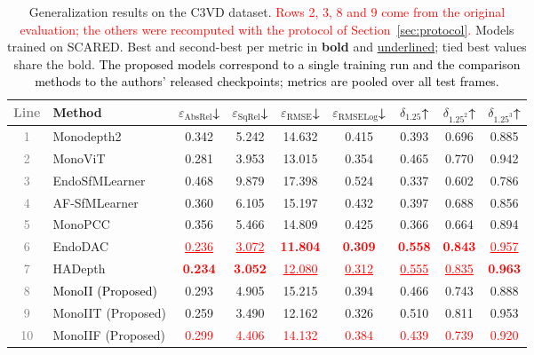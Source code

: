 \documentclass[a4paper,fleqn]{cas-dc}
\begin{document}
{\begin{table}[h]
\centering
\begin{tabular}{clccccccc}
\toprule
\textcolor{gray}{Line} & Method & $\varepsilon_\text{AbsRel}$↓ & 
        $\varepsilon_\text{SqRel}$↓ & 
        $\varepsilon_\text{RMSE}$↓ & 
        $\varepsilon_\text{RMSELog}$↓ & 
        $\delta_{1.25}$↑ & $\delta_{1.25^2}$↑ & 
        $\delta_{1.25^3}$↑ \\
\midrule
\textcolor{gray}{1} &Monodepth2     & 0.342 & 5.242 & 14.632 & 0.415 & 0.393 & 0.696 & 0.885 \\
\textcolor{gray}{2} &MonoViT        & 0.281 & 3.953 & 13.015 & 0.354 & 0.465 & 0.770 & 0.942 \\
\textcolor{gray}{3} &EndoSfMLearner & 0.468 & 9.879 & 17.398 & 0.524 & 0.337 & 0.602 & 0.786 \\
\textcolor{gray}{4} &AF-SfMLearner  & 0.360 & 6.105 & 15.197 & 0.432 & 0.397 & 0.688 & 0.856 \\
\textcolor{gray}{5} &MonoPCC        & 0.356 & 5.466 & 14.809 & 0.425 & 0.366 & 0.664 & 0.894 \\
\textcolor{gray}{6} &EndoDAC        & \textcolor{red}{\underline{0.236}} & \textcolor{red}{\underline{3.072}} & \textcolor{red}{\textbf{11.804}} & \textcolor{red}{\textbf{0.309}} & \textcolor{red}{\textbf{0.558}} & \textcolor{red}{\textbf{0.843}} & \textcolor{red}{\underline{0.957}} \\
\textcolor{gray}{7} &HADepth        & \textcolor{red}{\textbf{0.234}} & \textcolor{red}{\textbf{3.052}} & \textcolor{red}{\underline{12.080}} & \textcolor{red}{\underline{0.312}} & \textcolor{red}{\underline{0.555}} & \textcolor{red}{\underline{0.835}} & \textcolor{red}{\textbf{0.963}} \\
\midrule
\textcolor{gray}{8} & \textcolor{black}{MonoII (Proposed)} & 0.293 & 4.905 & 15.215 & 0.394 & 0.466 & 0.743 & 0.888 \\
\textcolor{gray}{9} &MonoIIT (Proposed) & 0.259 & 3.490 & 12.162 & 0.326 & 0.510 & 0.811 & 0.953 \\
\textcolor{gray}{10} &MonoIIF (Proposed) & \textcolor{red}{0.299} & \textcolor{red}{4.406} & \textcolor{red}{14.132} & \textcolor{red}{0.384} & \textcolor{red}{0.439} & \textcolor{red}{0.739} & \textcolor{red}{0.920} \\
\bottomrule
\end{tabular}
\caption{Generalization results on the C3VD dataset. \textcolor{red}{Rows 2, 3, 8 and 9 come from the original evaluation; the others were recomputed with the protocol of Section~\ref{sec:protocol}.} 
Models trained on SCARED. Best and second-best 
per metric in \textbf{bold} and \underline{underlined}; tied best values share the bold. \textcolor{black}{The proposed models correspond to a single training run and the comparison methods to the authors' released checkpoints; metrics are pooled over all test frames.}}
\label{tab:quant_c3vd}
\end{table}

}
\end{document}
